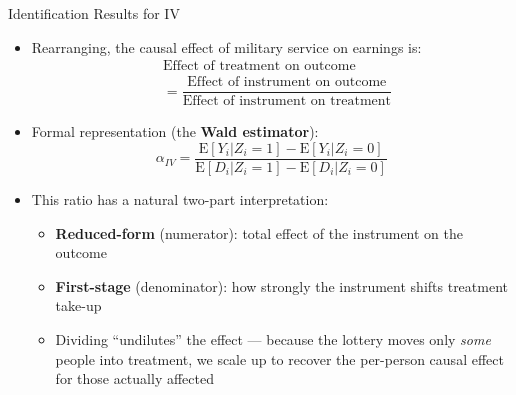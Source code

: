 \documentclass[dvipsnames,hyperref={pdfpagelabels=false}]{beamer}
\begin{document}
\begin{frame}{Identification Results for IV}
	\begin{itemize}

		\item Rearranging, the causal effect of military service on earnings is:
		\begin{equation*}
			\begin{aligned}
				& \text{Effect of treatment on outcome} \\
				&= \dfrac{\text{Effect of instrument on outcome}}{\text{Effect of instrument on treatment}}
			\end{aligned}
		\end{equation*}
		\item Formal representation (the \textbf{Wald estimator}):
		\begin{equation*}
			\alpha_{IV}=\dfrac{\mathrm{E}[Y_{i}|Z_{i}=1]-\mathrm{E}[Y_{i}|Z_{i}=0]}{\mathrm{E}[D_{i}|Z_{i}=1]-\mathrm{E}[D_{i}|Z_{i}=0]}
		\end{equation*}

		\item This ratio has a natural two-part interpretation:
				\vspace{0.2cm}
		\begin{itemize}
			\item \textbf{Reduced-form} (numerator): total effect of the instrument on the outcome
				\vspace{0.2cm}
			\item \textbf{First-stage} (denominator): how strongly the instrument shifts treatment take-up
				\vspace{0.2cm}
			\item Dividing ``undilutes'' the effect --- because the lottery moves only \emph{some} people into treatment, we scale up to recover the per-person causal effect for those actually affected
		\end{itemize}

	\end{itemize}
\end{frame}
\end{document}

